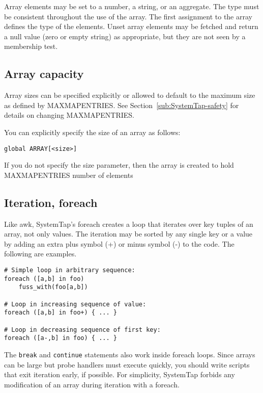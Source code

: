 \documentclass[twoside,english]{article}
\newenvironment{vindent}
{\begin{list}{}{\setlength{\listparindent}{6pt}}
\item[]}
{\end{list}}
\begin{document}
Array elements may be set to a number, a string, or an aggregate.
The type must be consistent
throughout the use of the array. The first assignment to the array defines
the type of the elements. Unset array elements may be fetched and return
a null value (zero or empty string) as appropriate, but they are not seen
by a membership test.


\subsection{Array capacity}

Array sizes can be specified explicitly or allowed to default to the maximum
size as defined by MAXMAPENTRIES. See Section~\ref{sub:SystemTap-safety}
for details on changing MAXMAPENTRIES.

You can explicitly specify the size of an array as follows:

\begin{vindent}
\begin{verbatim}
global ARRAY[<size>]
\end{verbatim}
\end{vindent}
If you do not specify the size parameter, then the array is created to hold
MAXMAPENTRIES number of elements


\subsection{Iteration, foreach}
Like awk, SystemTap's foreach creates a loop that iterates over key tuples
of an array, not only values. The iteration may be sorted by any single key
or a value by adding an extra plus symbol (+) or minus symbol (-) to the
code. The following are examples.

\begin{vindent}
\begin{verbatim}
# Simple loop in arbitrary sequence:
foreach ([a,b] in foo)
    fuss_with(foo[a,b])

# Loop in increasing sequence of value:
foreach ([a,b] in foo+) { ... }

# Loop in decreasing sequence of first key:
foreach ([a-,b] in foo) { ... }
\end{verbatim}
\end{vindent}
The \texttt{break} and \texttt{continue} statements also work inside foreach
loops. Since arrays can be large but probe handlers must execute quickly,
you should write scripts that exit iteration early, if possible. For simplicity,
SystemTap forbids any modification of an array during iteration with a foreach.
\end{document}
